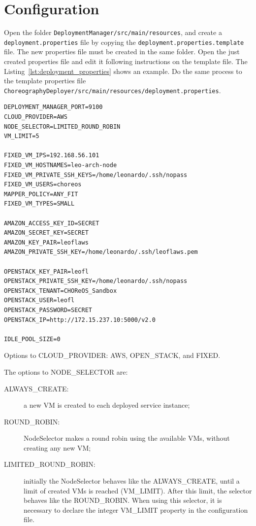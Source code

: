 \documentclass[a4paper, 10pt]{article}
\begin{document}
\section{Configuration}

Open the folder \texttt{DeploymentManager/src/main/resources}, and create a \texttt{deployment.properties} file by copying the \texttt{deployment.properties.template} file. The new properties file must be created in the same folder. Open the just created properties file and edit it following instructions on the template file. The Listing~\ref{lst:deployment_properties} shows an example. Do the same process to the template properties file \texttt{ChoreographyDeployer/src/main/resources/deployment.properties}.

\lstset{
numbers=left
}

{\footnotesize
\begin{lstlisting}[caption=deployment.properties example,label=lst:deployment_properties] 
DEPLOYMENT_MANAGER_PORT=9100
CLOUD_PROVIDER=AWS
NODE_SELECTOR=LIMITED_ROUND_ROBIN
VM_LIMIT=5

FIXED_VM_IPS=192.168.56.101
FIXED_VM_HOSTNAMES=leo-arch-node
FIXED_VM_PRIVATE_SSH_KEYS=/home/leonardo/.ssh/nopass
FIXED_VM_USERS=choreos
MAPPER_POLICY=ANY_FIT
FIXED_VM_TYPES=SMALL

AMAZON_ACCESS_KEY_ID=SECRET
AMAZON_SECRET_KEY=SECRET
AMAZON_KEY_PAIR=leoflaws
AMAZON_PRIVATE_SSH_KEY=/home/leonardo/.ssh/leoflaws.pem

OPENSTACK_KEY_PAIR=leofl
OPENSTACK_PRIVATE_SSH_KEY=/home/leonardo/.ssh/nopass
OPENSTACK_TENANT=CHOReOS_Sandbox
OPENSTACK_USER=leofl
OPENSTACK_PASSWORD=SECRET
OPENSTACK_IP=http://172.15.237.10:5000/v2.0

IDLE_POOL_SIZE=0

\end{lstlisting}
}

Options to CLOUD\_PROVIDER: AWS, OPEN\_STACK, and FIXED.

The options to NODE\_SELECTOR are: 

\begin{description}
\item [ALWAYS\_CREATE:] a new VM is created to each deployed service instance;
\item [ROUND\_ROBIN:] \textsf{NodeSelector} makes a round robin using the available VMs, without creating any new VM;
\item [LIMITED\_ROUND\_ROBIN:] initially the \textsf{NodeSelector} behaves like the ALWAYS\_CREATE, until a limit of created VMs is reached (VM\_LIMIT). After this limit, the selector behaves like the ROUND\_ROBIN. When using this selector, it is necessary to declare the integer VM\_LIMIT property in the configuration file.
\end{description}
\end{document}
